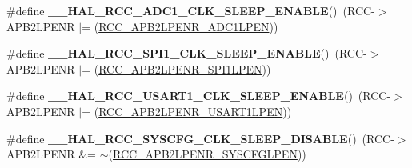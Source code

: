 \begin{DoxyCompactItemize}
\item 
\hypertarget{group___r_c_c___peripheral___clock___sleep___enable___disable_ga37931819af9a7b1a05385e0ae6c984b6}{\#define {\bfseries \-\_\-\-\_\-\-H\-A\-L\-\_\-\-R\-C\-C\-\_\-\-A\-D\-C1\-\_\-\-C\-L\-K\-\_\-\-S\-L\-E\-E\-P\-\_\-\-E\-N\-A\-B\-L\-E}()~(R\-C\-C-\/$>$A\-P\-B2\-L\-P\-E\-N\-R $\vert$= (\hyperlink{group___peripheral___registers___bits___definition_ga126a8791f77cecc599e32d2c882a4dab}{R\-C\-C\-\_\-\-A\-P\-B2\-L\-P\-E\-N\-R\-\_\-\-A\-D\-C1\-L\-P\-E\-N}))}\label{group___r_c_c___peripheral___clock___sleep___enable___disable_ga37931819af9a7b1a05385e0ae6c984b6}

\item 
\hypertarget{group___r_c_c___peripheral___clock___sleep___enable___disable_ga41997855b2cc7563c8ed0c9873d32daf}{\#define {\bfseries \-\_\-\-\_\-\-H\-A\-L\-\_\-\-R\-C\-C\-\_\-\-S\-P\-I1\-\_\-\-C\-L\-K\-\_\-\-S\-L\-E\-E\-P\-\_\-\-E\-N\-A\-B\-L\-E}()~(R\-C\-C-\/$>$A\-P\-B2\-L\-P\-E\-N\-R $\vert$= (\hyperlink{group___peripheral___registers___bits___definition_ga2c6729058e54f4b8f8ae01d5b3586aaa}{R\-C\-C\-\_\-\-A\-P\-B2\-L\-P\-E\-N\-R\-\_\-\-S\-P\-I1\-L\-P\-E\-N}))}\label{group___r_c_c___peripheral___clock___sleep___enable___disable_ga41997855b2cc7563c8ed0c9873d32daf}

\item 
\hypertarget{group___r_c_c___peripheral___clock___sleep___enable___disable_ga454514918be60a95069da332eb212712}{\#define {\bfseries \-\_\-\-\_\-\-H\-A\-L\-\_\-\-R\-C\-C\-\_\-\-U\-S\-A\-R\-T1\-\_\-\-C\-L\-K\-\_\-\-S\-L\-E\-E\-P\-\_\-\-E\-N\-A\-B\-L\-E}()~(R\-C\-C-\/$>$A\-P\-B2\-L\-P\-E\-N\-R $\vert$= (\hyperlink{group___peripheral___registers___bits___definition_gab8b429bc8d52abd1ba3818a82542bb98}{R\-C\-C\-\_\-\-A\-P\-B2\-L\-P\-E\-N\-R\-\_\-\-U\-S\-A\-R\-T1\-L\-P\-E\-N}))}\label{group___r_c_c___peripheral___clock___sleep___enable___disable_ga454514918be60a95069da332eb212712}

\item 
\hypertarget{group___r_c_c___peripheral___clock___sleep___enable___disable_ga04863ff5c2174552387c549f0410df43}{\#define {\bfseries \-\_\-\-\_\-\-H\-A\-L\-\_\-\-R\-C\-C\-\_\-\-S\-Y\-S\-C\-F\-G\-\_\-\-C\-L\-K\-\_\-\-S\-L\-E\-E\-P\-\_\-\-D\-I\-S\-A\-B\-L\-E}()~(R\-C\-C-\/$>$A\-P\-B2\-L\-P\-E\-N\-R \&= $\sim$(\hyperlink{group___peripheral___registers___bits___definition_gaaa82cfc33f0cf71220398bbe1c4b412e}{R\-C\-C\-\_\-\-A\-P\-B2\-L\-P\-E\-N\-R\-\_\-\-S\-Y\-S\-C\-F\-G\-L\-P\-E\-N}))}\label{group___r_c_c___peripheral___clock___sleep___enable___disable_ga04863ff5c2174552387c549f0410df43}


\end{DoxyCompactItemize}

